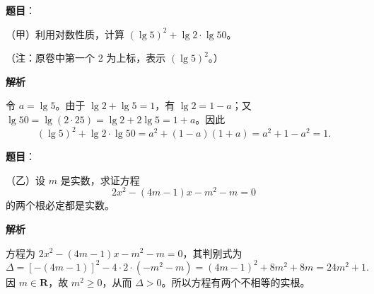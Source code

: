 


\begin{answer}

\textbf{题目}：

（甲）利用对数性质，计算 $(\lg 5)^2+\lg 2\cdot\lg 50$。

（注：原卷中第一个 2 为上标，表示 $(\lg 5)^2$。）

\textbf{解析}

令 $a=\lg5$。由于 $\lg2+\lg5=1$，有 $\lg2=1-a$；又 $\lg50=\lg(2\cdot25)=\lg2+2\lg5=1+a$。因此
\nopagebreak[4]
\[
(\lg5)^2+\lg2\cdot\lg50
=a^2+(1-a)(1+a)
=a^2+1-a^2=1.
\]


\end{answer}
\begin{answer}

\textbf{题目}：

（乙）设 $m$ 是实数，求证方程
\nopagebreak[4]
\[
2x^2-(4m-1)x-m^2-m=0
\]
的两个根必定都是实数。

\textbf{解析}

方程为 $2x^2-(4m-1)x-m^2-m=0$，其判别式为
\nopagebreak[4]
\[
\Delta=[-(4m-1)]^2-4\cdot2\cdot(-m^2-m)
=(4m-1)^2+8m^2+8m
=24m^2+1.
\]
因 $m\in\mathbf R$，故 $m^2\geqslant0$，从而 $\Delta>0$。所以方程有两个不相等的实根。


\end{answer}
